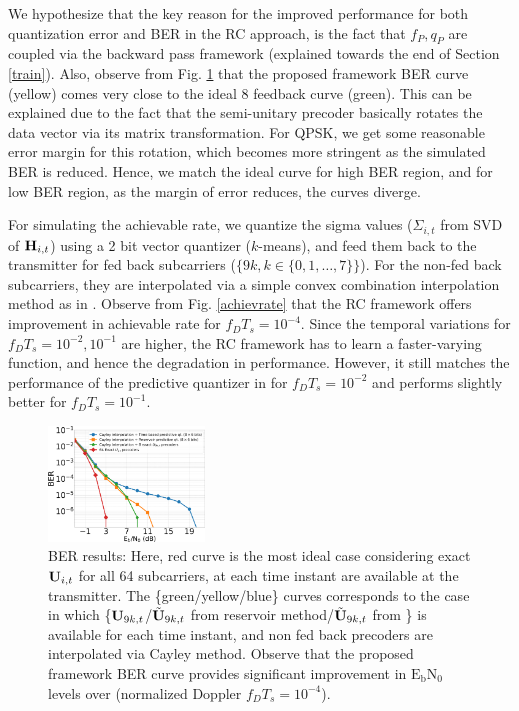 \documentclass[conference]{IEEEtran}
\begin{document}
{We hypothesize that the key reason for the improved performance for both quantization error and BER in the RC approach, is the fact that $f_P,q_P$ are coupled via the backward pass framework (explained towards the end of Section \ref{train}). Also, observe from Fig. \ref{BER} that the proposed framework BER curve (yellow) comes very close to the ideal $8$ feedback curve (green). This can be explained due to the fact that the semi-unitary precoder basically rotates the data vector via its matrix transformation. For QPSK, we get some reasonable error margin for this rotation, which becomes more stringent as the simulated BER is reduced. Hence, we match the ideal curve for high BER region, and for low BER region, as the margin of error reduces, the curves diverge.

\noindent For simulating the achievable rate, we quantize the sigma values ($\Sigma_{i,t}$ from SVD of ${\bf H}_{i,t}$) using a 2 bit vector quantizer ($k$-means), and feed them back to the transmitter for fed back subcarriers ($\{9k, k \in \{0,1,\ldots,7\}\}$). For the non-fed back subcarriers, they are interpolated via a simple convex combination interpolation method as in \cite{Gupt1905:Predictive}. Observe from Fig. \ref{achievrate} that the RC framework offers improvement in achievable rate for $f_DT_s=10^{-4}$. Since the temporal variations for $f_DT_s=10^{-2}, 10^{-1}$ are higher, the RC framework has to learn a faster-varying function, and hence the degradation in performance. However, it still matches the performance of the predictive quantizer in \cite{6891198} for $f_DT_s=10^{-2}$ and performs slightly better for $f_DT_s=10^{-1}$.
\vspace{-3pt}

\begin{figure}
\centering
\includegraphics[width=0.37\textwidth]{images/BER_res.pdf}
\vspace{-5pt}
\caption{BER results: Here, red curve is the most ideal case considering exact ${\bf U}_{i,t}$ for all 64 subcarriers, at each time instant are available at the transmitter. The \{green/yellow/blue\} curves corresponds to the case in which \{${\bf U}_{9k,t}$/$\tilde{{\bf U}}_{9k,t}$ from reservoir method/$\tilde{{\bf U}}_{9k,t}$ from \cite{6891198}\} is available for each time instant, and non fed back precoders are interpolated via Cayley method. Observe that the proposed framework BER curve provides significant improvement in $\text{E}_\text{b}\text{N}_0$ levels over \cite{6891198} (normalized Doppler $f_DT_s=10^{-4}$).}
\vspace{5pt}
\label{BER}
\end{figure}

}
\end{document}
